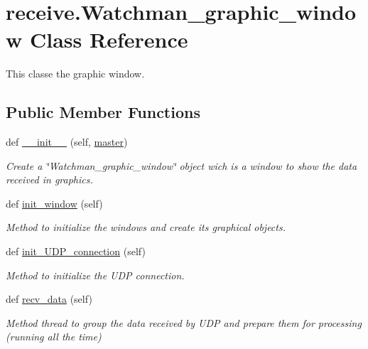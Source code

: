 \hypertarget{classreceive_1_1_watchman__graphic__window}{}\section{receive.\+Watchman\+\_\+graphic\+\_\+window Class Reference}
\label{classreceive_1_1_watchman__graphic__window}


This classe the graphic window.  


\subsection*{Public Member Functions}
\begin{DoxyCompactItemize}
\item 
def \mbox{\hyperlink{classreceive_1_1_watchman__graphic__window_ab37e9e313e24f7048041e71a7f170137}{\+\_\+\+\_\+init\+\_\+\+\_\+}} (self, \mbox{\hyperlink{classreceive_1_1_watchman__graphic__window_a03235614332394871ff2b4564bfa1ede}{master}})
\begin{DoxyCompactList}\small\item\em Create a \char`\"{}\+Watchman\+\_\+graphic\+\_\+window\char`\"{} object wich is a window to show the data received in graphics. \end{DoxyCompactList}\item 
def \mbox{\hyperlink{classreceive_1_1_watchman__graphic__window_a784cc76bfc1b70575c6fda548c3ca8b7}{init\+\_\+window}} (self)
\begin{DoxyCompactList}\small\item\em Method to initialize the windows and create its graphical objects. \end{DoxyCompactList}\item 
def \mbox{\hyperlink{classreceive_1_1_watchman__graphic__window_acced41ba9696b91f924f1505a6d7b88f}{init\+\_\+\+U\+D\+P\+\_\+connection}} (self)
\begin{DoxyCompactList}\small\item\em Method to initialize the U\+DP connection. \end{DoxyCompactList}\item 
def \mbox{\hyperlink{classreceive_1_1_watchman__graphic__window_ab2f6066c7bc853a9acaecdcb19b91b55}{recv\+\_\+data}} (self)
\begin{DoxyCompactList}\small\item\em Method thread to group the data received by U\+DP and prepare them for processing (running all the time) \end{DoxyCompactList}\item 

\end{DoxyCompactItemize}
